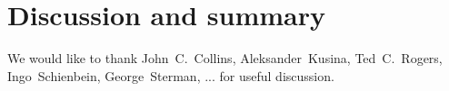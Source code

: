 \documentclass[pdftex,twocolumn,epjc3]{svjour3}          %
\begin{document}
\section{Discussion and summary}

\begin{acknowledgements}

We would like to thank
John~C.~Collins,
Aleksander~Kusina,
Ted~C.~Rogers,
Ingo~Schienbein,
George~Sterman,
...
for useful discussion.

\end{acknowledgements}







\end{document}
